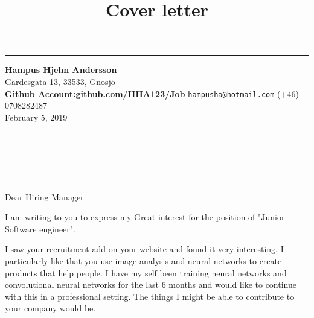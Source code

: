 \documentclass[]{article}
\title{Cover letter\vspace{1cm}} %
\author{}
\date{}
\begin{document}



\maketitle

\begin{center}\rule{0.99\linewidth}{\linethickness}\end{center}
\textbf{Hampus Hjelm Andersson}\\
Gärdesgata 13, 33533, Gnosjö\\
\href{https://github.com/HHA123/Job/}{\textbf{Github Account:github.com/HHA123/Job}
}
\textbar{}\textbar{}
\href{mailto:hampusha@hotmail.com}{\nolinkurl{hampusha@hotmail.com}}
\textbar{}\textbar{} (+46) 0708282487 \\
February 5, 2019
\vspace{1mm}
\begin{center}\rule{0.99\linewidth}{\linethickness}\end{center}
\hypertarget{section}{%
\section{\texorpdfstring{\\
}{ }}\label{section}}

Dear Hiring Manager

I am writing to you to express my Great interest for the position of
"Junior Software engineer".

I saw your recruitment add on your website and found it very interesting.
I particularly like that you use image analysis and neural networks
 to create products that  help people.
 I have my self been training neural networks and convolutional neural networks for
 the last 6 months and would like to continue with
 this in a professional setting.
The things I might be able to contribute to your company would be.




\end{document}

